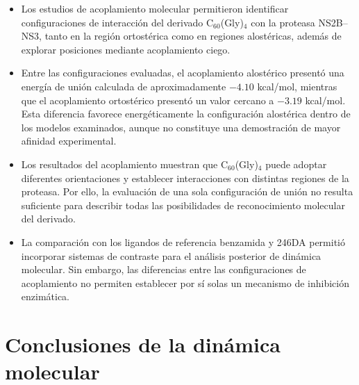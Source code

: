 \begin{itemize}

    \item Los estudios de acoplamiento molecular
    permitieron identificar configuraciones
    de interacción del derivado
    C$_{60}$(Gly)$_4$ con la proteasa NS2B--NS3,
    tanto en la región ortostérica como en
    regiones alostéricas, además de explorar
    posiciones mediante acoplamiento ciego.

    \item Entre las configuraciones evaluadas,
    el acoplamiento alostérico presentó una
    energía de unión calculada de aproximadamente
    $-4.10$ kcal/mol, mientras que el acoplamiento
    ortostérico presentó un valor cercano a
    $-3.19$ kcal/mol. Esta diferencia favorece
    energéticamente la configuración alostérica
    dentro de los modelos examinados, aunque
    no constituye una demostración de mayor
    afinidad experimental.

    \item Los resultados del acoplamiento
    muestran que C$_{60}$(Gly)$_4$ puede adoptar
    diferentes orientaciones y establecer
    interacciones con distintas regiones
    de la proteasa. Por ello, la evaluación
    de una sola configuración de unión
    no resulta suficiente para describir
    todas las posibilidades de reconocimiento
    molecular del derivado.

    \item La comparación con los ligandos
    de referencia benzamida y 246DA permitió
    incorporar sistemas de contraste para
    el análisis posterior de dinámica molecular.
    Sin embargo, las diferencias entre las
    configuraciones de acoplamiento no
    permiten establecer por sí solas
    un mecanismo de inhibición enzimática.

\end{itemize}

\section{Conclusiones de la dinámica molecular}

